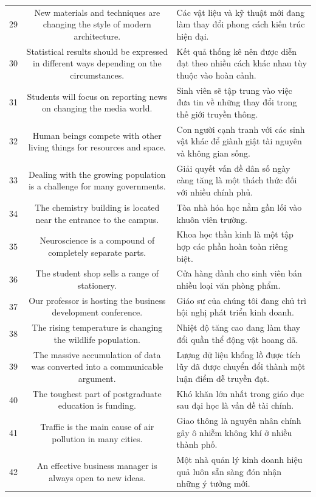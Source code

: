 \documentclass[11pt,a4paper]{article}
\begin{document}
\begin{longtable}{N S M}
29 & New materials and techniques are changing the style of modern architecture. & Các vật liệu và kỹ thuật mới đang làm thay đổi phong cách kiến ​​trúc hiện đại. \\
30 & Statistical results should be expressed in different ways depending on the circumstances. & Kết quả thống kê nên được diễn đạt theo nhiều cách khác nhau tùy thuộc vào hoàn cảnh. \\
31 & Students will focus on reporting news on changing the media world. & Sinh viên sẽ tập trung vào việc đưa tin về những thay đổi trong thế giới truyền thông. \\
32 & Human beings compete with other living things for resources and space. & Con người cạnh tranh với các sinh vật khác để giành giật tài nguyên và không gian sống. \\
33 & Dealing with the growing population is a challenge for many governments. & Giải quyết vấn đề dân số ngày càng tăng là một thách thức đối với nhiều chính phủ. \\
34 & The chemistry building is located near the entrance to the campus. & Tòa nhà hóa học nằm gần lối vào khuôn viên trường. \\
35 & Neuroscience is a compound of completely separate parts. & Khoa học thần kinh là một tập hợp các phần hoàn toàn riêng biệt. \\
36 & The student shop sells a range of stationery. & Cửa hàng dành cho sinh viên bán nhiều loại văn phòng phẩm. \\
37 & Our professor is hosting the business development conference. & Giáo sư của chúng tôi đang chủ trì hội nghị phát triển kinh doanh. \\
38 & The rising temperature is changing the wildlife population. & Nhiệt độ tăng cao đang làm thay đổi quần thể động vật hoang dã. \\
39 & The massive accumulation of data was converted into a communicable argument. & Lượng dữ liệu khổng lồ được tích lũy đã được chuyển đổi thành một luận điểm dễ truyền đạt. \\
40 & The toughest part of postgraduate education is funding. & Khó khăn lớn nhất trong giáo dục sau đại học là vấn đề tài chính. \\
41 & Traffic is the main cause of air pollution in many cities. & Giao thông là nguyên nhân chính gây ô nhiễm không khí ở nhiều thành phố. \\
42 & An effective business manager is always open to new ideas. & Một nhà quản lý kinh doanh hiệu quả luôn sẵn sàng đón nhận những ý tưởng mới. \\

\end{longtable}
\end{document}

